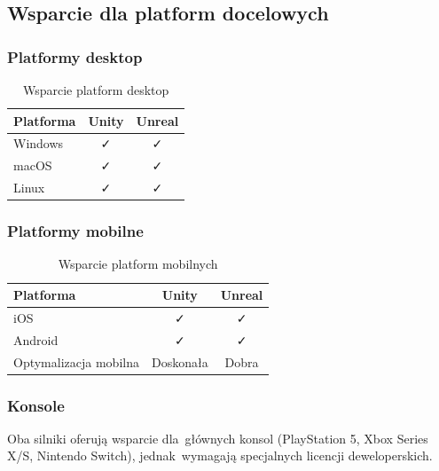 \subsection{Wsparcie dla platform docelowych}

\subsubsection{Platformy desktop}

\begin{table}[h!]
    \centering
    \caption{Wsparcie platform desktop}
    \label{tab:platform-desktop}
    \begin{tabular}{|l|c|c|}
        \hline
        \textbf{Platforma} & \textbf{Unity} & \textbf{Unreal} \\
        \hline\hline
        Windows & ✓ & ✓ \\
        \hline
        macOS & ✓ & ✓ \\
        \hline
        Linux & ✓ & ✓ \\
        \hline
    \end{tabular}
\end{table}

\subsubsection{Platformy mobilne}

\begin{table}[h!]
    \centering
    \caption{Wsparcie platform mobilnych}
    \label{tab:platform-mobile}
    \begin{tabular}{|l|c|c|}
        \hline
        \textbf{Platforma} & \textbf{Unity} & \textbf{Unreal} \\
        \hline\hline
        iOS & ✓ & ✓ \\
        \hline
        Android & ✓ & ✓ \\
        \hline
        Optymalizacja mobilna & Doskonała & Dobra \\
        \hline
    \end{tabular}
\end{table}

\subsubsection{Konsole}

Oba silniki oferują wsparcie dla~głównych konsol (PlayStation 5, Xbox Series X/S, Nintendo Switch), jednak~wymagają specjalnych licencji deweloperskich.

